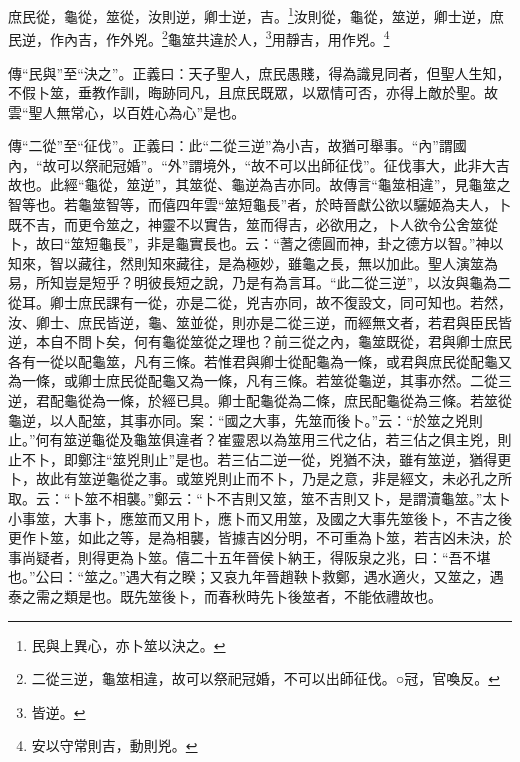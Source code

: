 庶民從，龜從，筮從，汝則逆，卿士逆，吉。\footnote{民與上異心，亦卜筮以決之。}汝則從，龜從，筮逆，卿士逆，庶民逆，作內吉，作外兇。\footnote{二從三逆，龜筮相違，故可以祭祀冠婚，不可以出師征伐。○冠，官喚反。}龜筮共違於人，\footnote{皆逆。}用靜吉，用作兇。\footnote{安以守常則吉，動則兇。}

{\noindent\zhuan{}\fzbyks 傳“民與”至“決之”。正義曰：天子聖人，庶民愚賤，得為識見同者，但聖人生知，不假卜筮，垂教作訓，晦跡同凡，且庶民既眾，以眾情可否，亦得上敵於聖。故雲“聖人無常心，以百姓心為心”是也。 \par}

{\noindent\zhuan{}\fzbyks 傳“二從”至“征伐”。正義曰：此“二從三逆”為小吉，故猶可舉事。“內”謂國內，“故可以祭祀冠婚”。“外”謂境外，“故不可以出師征伐”。征伐事大，此非大吉故也。此經“龜從，筮逆”，其筮從、龜逆為吉亦同。故傳言“龜筮相違”，見龜筮之智等也。若龜筮智等，而僖四年雲“筮短龜長”者，於時晉獻公欲以驪姬為夫人，卜既不吉，而更令筮之，神靈不以實告，筮而得吉，必欲用之，卜人欲令公舍筮從卜，故曰“筮短龜長”，非是龜實長也。云：“蓍之德圓而神，卦之德方以智。”神以知來，智以藏往，然則知來藏往，是為極妙，雖龜之長，無以加此。聖人演筮為易，所知豈是短乎？明彼長短之說，乃是有為言耳。“此二從三逆”，以汝與龜為二從耳。卿士庶民課有一從，亦是二從，兇吉亦同，故不復設文，同可知也。若然，汝、卿士、庶民皆逆，龜、筮並從，則亦是二從三逆，而經無文者，若君與臣民皆逆，本自不問卜矣，何有龜從筮從之理也？前三從之內，龜筮既從，君與卿士庶民各有一從以配龜筮，凡有三條。若惟君與卿士從配龜為一條，或君與庶民從配龜又為一條，或卿士庶民從配龜又為一條，凡有三條。若筮從龜逆，其事亦然。二從三逆，君配龜從為一條，於經已具。卿士配龜從為二條，庶民配龜從為三條。若筮從龜逆，以人配筮，其事亦同。案：“國之大事，先筮而後卜。”云：“於筮之兇則止。”何有筮逆龜從及龜筮俱違者？崔靈恩以為筮用三代之佔，若三佔之俱主兇，則止不卜，即鄭注“筮兇則止”是也。若三佔二逆一從，兇猶不決，雖有筮逆，猶得更卜，故此有筮逆龜從之事。或筮兇則止而不卜，乃是之意，非是經文，未必孔之所取。云：“卜筮不相襲。”鄭云：“卜不吉則又筮，筮不吉則又卜，是謂瀆龜筮。”太卜小事筮，大事卜，應筮而又用卜，應卜而又用筮，及國之大事先筮後卜，不吉之後更作卜筮，如此之等，是為相襲，皆據吉凶分明，不可重為卜筮，若吉凶未決，於事尚疑者，則得更為卜筮。僖二十五年晉侯卜納王，得阪泉之兆，曰：“吾不堪也。”公曰：“筮之。”遇大有之睽；又哀九年晉趙鞅卜救鄭，遇水適火，又筮之，遇泰之需之類是也。既先筮後卜，而春秋時先卜後筮者，不能依禮故也。 \par}

